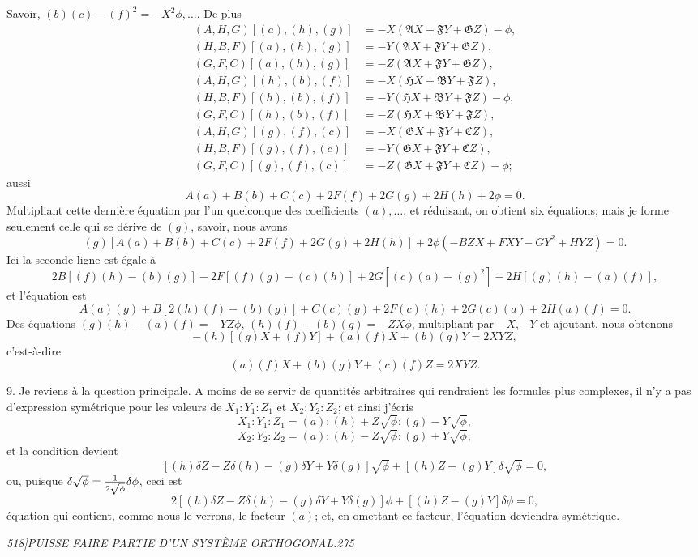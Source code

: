 \documentclass[11pt]{article}
\newcommand{\phead}[3]{\noindent\textit{#1\hfill #2\hfill #3}\par\medskip}
\newcommand{\D}{\delta}
\newcommand{\frA}{\mathfrak A}
\newcommand{\frB}{\mathfrak B}
\newcommand{\frC}{\mathfrak C}
\newcommand{\frF}{\mathfrak F}
\newcommand{\frG}{\mathfrak G}
\newcommand{\frH}{\mathfrak H}
\begin{document}
Savoir, $(b)(c)-(f)^2=-X^2\phi,\ldots$. De plus
\[
\begin{array}{rl}
(A,H,G)[(a),(h),(g)]&=-X(\frA X+\frF Y+\frG Z)-\phi,\\
(H,B,F)[(a),(h),(g)]&=-Y(\frA X+\frF Y+\frG Z),\\
(G,F,C)[(a),(h),(g)]&=-Z(\frA X+\frF Y+\frG Z),\\
(A,H,G)[(h),(b),(f)]&=-X(\frH X+\frB Y+\frF Z),\\
(H,B,F)[(h),(b),(f)]&=-Y(\frH X+\frB Y+\frF Z)-\phi,\\
(G,F,C)[(h),(b),(f)]&=-Z(\frH X+\frB Y+\frF Z),\\
(A,H,G)[(g),(f),(c)]&=-X(\frG X+\frF Y+\frC Z),\\
(H,B,F)[(g),(f),(c)]&=-Y(\frG X+\frF Y+\frC Z),\\
(G,F,C)[(g),(f),(c)]&=-Z(\frG X+\frF Y+\frC Z)-\phi;
\end{array}
\]
aussi
\[
A(a)+B(b)+C(c)+2F(f)+2G(g)+2H(h)+2\phi=0.
\]
Multipliant cette derni\`ere \'equation par l'un quelconque des coefficients
$(a),\ldots$, et r\'eduisant, on obtient six \'equations; mais je forme seulement celle qui
se d\'erive de $(g)$, savoir, nous avons
\[
(g)[A(a)+B(b)+C(c)+2F(f)+2G(g)+2H(h)]
+2\phi(-BZX+FXY-GY^2+HYZ)=0.
\]
Ici la seconde ligne est \'egale \`a
\[
2B[(f)(h)-(b)(g)]-2F[(f)(g)-(c)(h)]
+2G[(c)(a)-(g)^2]-2H[(g)(h)-(a)(f)],
\]
et l'\'equation est
\[
A(a)(g)+B[2(h)(f)-(b)(g)]+C(c)(g)+2F(c)(h)+2G(c)(a)+2H(a)(f)=0.
\]
Des \'equations $(g)(h)-(a)(f)=-YZ\phi$, $(h)(f)-(b)(g)=-ZX\phi$, multipliant par
$-X,-Y$ et ajoutant, nous obtenons
\[
-(h)[(g)X+(f)Y]+(a)(f)X+(b)(g)Y=2XYZ,
\]
c'est-\`a-dire
\[
(a)(f)X+(b)(g)Y+(c)(f)Z=2XYZ.
\]

9. Je reviens \`a la question principale. A moins de se servir de quantit\'es arbitraires
qui rendraient les formules plus complexes, il n'y a pas d'expression sym\'etrique pour
les valeurs de $X_1:Y_1:Z_1$ et $X_2:Y_2:Z_2$; et ainsi j'\'ecris
\[
X_1:Y_1:Z_1=(a):(h)+Z\sqrt{\phi}:(g)-Y\sqrt{\phi},
\]
\[
X_2:Y_2:Z_2=(a):(h)-Z\sqrt{\phi}:(g)+Y\sqrt{\phi},
\]
et la condition devient
\[
[(h)\D Z-Z\D(h)-(g)\D Y+Y\D(g)]\sqrt{\phi}+[(h)Z-(g)Y]\D\sqrt{\phi}=0,
\]
ou, puisque $\D\sqrt{\phi}={1\over2\sqrt{\phi}}\D\phi$, ceci est
\[
2[(h)\D Z-Z\D(h)-(g)\D Y+Y\D(g)]\phi+[(h)Z-(g)Y]\D\phi=0,
\]
\'equation qui contient, comme nous le verrons, le facteur $(a)$; et, en omettant ce
facteur, l'\'equation deviendra sym\'etrique.

\clearpage

\phead{518]}{PUISSE FAIRE PARTIE D'UN SYST\`EME ORTHOGONAL.}{275}
\end{document}
